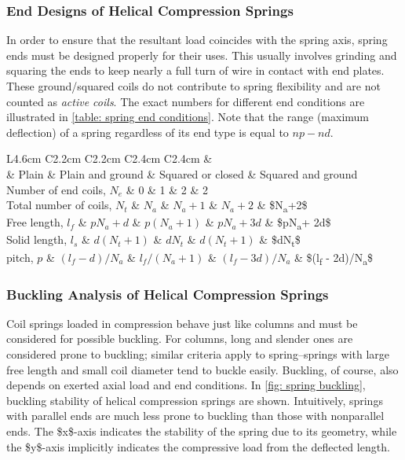 \documentclass[a4paper,openany,nobib]{tufte-book}
\begin{document}
{{\subsubsection{End Designs of Helical Compression Springs}
\label{end-designs-of-helical-compression-springs}
In order to ensure that the resultant load coincides with the spring
axis, spring ends must be designed properly for their uses. This usually
involves grinding and squaring the ends to keep nearly a full turn of
wire in contact with end plates. These ground/squared coils do not
contribute to spring flexibility and are not counted as \emph{active coils}.
The exact numbers for different end conditions are illustrated in
\ref{table: spring end conditions}. Note
that the range (maximum deflection) of a spring regardless of its end
type is equal to \(np - nd\).


 L4.6cm C2.2cm C2.2cm C2.4cm C2.4cm \&\\
\& Plain \& Plain and ground \& Squared or closed \& Squared and ground\\
Number of end coils, \(N_e\) \& 0 \& 1 \& 2 \& 2\\
Total number of coils, \(N_t\) \& \(N_a\) \& \(N_a+1\) \& \(N_a+2\) \& \$N\textsubscript{a}+2\$\\
Free length, \(l_f\) \& \(pN_a+d\) \& \(p(N_a+1)\) \& \(pN_a+3d\) \& \$pN\textsubscript{a}+ 2d\$\\
Solid length, \(l_s\) \& \(d(N_t+1)\) \& \(d N_t\) \& \(d(N_t+1)\) \& \$dN\textsubscript{t}\$\\
pitch, \(p\) \& \((l_f - d)/N_a\) \& \(l_f/(N_a + 1)\) \& \((l_f - 3d)/N_a\) \&
\$(l\textsubscript{f} - 2d)/N\textsubscript{a}\$\\

\subsubsection{Buckling Analysis of Helical Compression Springs}
\label{buckling-analysis-of-helical-compression-springs}
Coil springs loaded in compression behave just like columns and must be
considered for possible buckling. For columns, long and slender ones are
considered prone to buckling; similar criteria apply to spring--springs
with large free length and small coil diameter tend to buckle easily.
Buckling, of course, also depends on exerted axial load and end
conditions. In \ref{fig: spring buckling},
buckling stability of helical compression springs are shown.
Intuitively, springs with parallel ends are much less prone to buckling
than those with nonparallel ends. The \$x\$-axis indicates the stability
of the spring due to its geometry, while the \$y\$-axis implicitly
indicates the compressive load from the deflected length.

}}
\end{document}
